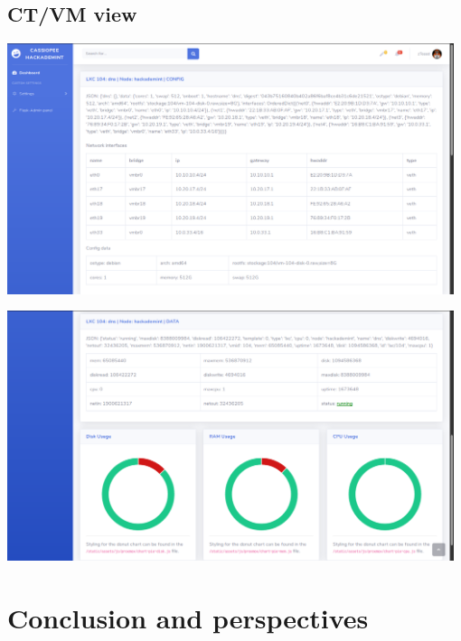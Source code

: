 \subsection{CT/VM view}
\vspace{1cm}
\begin{center}
\includegraphics[width=0.98\textwidth]{images/flask-application-2.png}
\end{center}
\vspace{1cm}
\begin{center}
\includegraphics[width=0.98\textwidth]{images/flask-application-3.png}
\end{center}

\pagebreak 

\section{Conclusion and perspectives}


